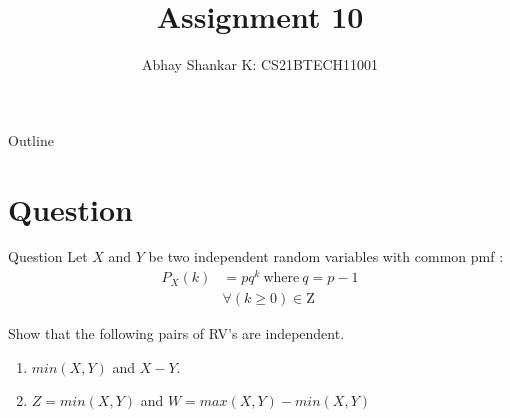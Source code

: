 \documentclass{beamer}
\DeclareMathOperator*{\pipe}{|}
\begin{document}
\newcommand{\bfr}[2]{\section{#1} \begin{frame}{#1} #2 \end{frame}}

	\title{Assignment 10}
		\author{ Abhay Shankar K: CS21BTECH11001}
\date{}
	\begin{frame}
    		\titlepage
	\end{frame}

	\begin{frame}{Outline}
    		\tableofcontents
	\end{frame}

	\providecommand{\brak}[1]{\ensuremath{\left(#1\right)}}
	\providecommand{\sbrak}[1]{\ensuremath{\left[#1\right]}}
	\providecommand{\cbrak}[1]{\ensuremath{\left\{#1\right\}}}
	\providecommand{\req}{\textbf{Required:}}
	\providecommand{\mn}[2]{\ensuremath{min\brak{#1, #2}}}
	\providecommand{\mx}[2]{\ensuremath{max\brak{#1, #2}}}
	\providecommand{\rpr}[2]{\ensuremath{P_{#1}\left(#2\right)}} %
	\providecommand{\spr}[1]{\ensuremath{P\left(#1\right)}} %
	\providecommand{\cpr}[2]{\ensuremath{\spr{#1 \pipe #2}}} %
	\newcommand*{\permcomb}[4][0mu]{{{}^{#3}\mkern#1#2_{#4}}}
	\newcommand*{\perm}[1][-3mu]{\permcomb[#1]{P}}
	\newcommand*{\comb}[1][-1mu]{\permcomb[#1]{C}}
	\newcommand{\abs}[1]{\left| #1 \right|}
	\newcommand{\pow}[2]{\ensuremath{#1^{#2}}}
	\newcommand{\e}[1]{\pow{e}{#1}}
	
	\providecommand{\pmf}[2]{\ensuremath{f_{#2}\left(#1\right)}}
	\providecommand{\cdf}[2]{\ensuremath{F_{#2}\left(#1\right)}}
	
	\bfr{Question}{
		Let $X$ and $Y$ be two independent random variables with common pmf :
		\begin{align}
			\rpr{X}{k} &= pq^k\ \text{where}\ q = p - 1\nonumber \\
			&\forall \brak{k \geq 0} \in \mathrm{Z} 
				\label{pmf}
		\end{align}
		
		Show that the following pairs of RV's are independent.
		\begin{enumerate}[label = \brak{\textbf{\roman*}}]
			\item $\mn{X}{Y}$ and $X - Y$.
			\item $Z = \mn{X}{Y}$ and $W = \mx{X}{Y} - \mn{X}{Y}$
		\end{enumerate}
	}
	
\end{document}
